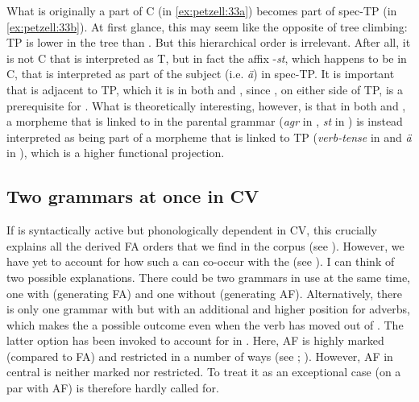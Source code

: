 \documentclass[output=paper,colorlinks,citecolor=brown,draft,draftmode]{langscibook}
\begin{document}
What is originally a part of C (in \ref{ex:petzell:33a}) becomes part of spec-TP (in \ref{ex:petzell:33b}). At first glance, this may seem like the opposite of tree climbing: TP is lower in the tree than . But this hierarchical order is irrelevant. After all, it is not C that is interpreted as T, but in fact the  affix -\textit{st}, which happens to be in C, that is interpreted as part of the subject (i.e. \textit{ä}) in spec-TP. It is important that  is adjacent to TP, which it is in both  and , since , on either side of TP, is a prerequisite for . What is theoretically interesting, however, is that in both  and , a morpheme that is linked to  in the parental grammar (\textit{agr} in , \textit{st} in ) is instead interpreted as being part of a morpheme that is linked to TP (\textit{verb-tense} in  and \textit{ä} in ), which is a higher functional projection.


\subsection{Two grammars at once in CV}\label{sec:petzell:5.3}


If  is syntactically active but phonologically dependent in CV, this crucially explains all the  derived FA orders that we find in the corpus (see ). However, we have yet to account for how such a  can co-occur with the  (see ). I can think of two possible explanations. There could be two grammars in use at the same time, one with  (generating FA) and one without  (generating AF). Alternatively, there is only one grammar with  but with an additional and higher position for adverbs, which makes the  a possible outcome even when the verb has moved out of . The latter option has been invoked to account for  in . Here, AF is highly marked (compared to FA) and restricted in a number of ways (see \citealt{BobaljikThrainsson1998}; \citealt{Thrainsson2007,Thrainsson2010}). However, AF in central  is neither marked nor restricted. To treat it as an exceptional case (on a par with  AF) is therefore hardly called for.
\end{document}
